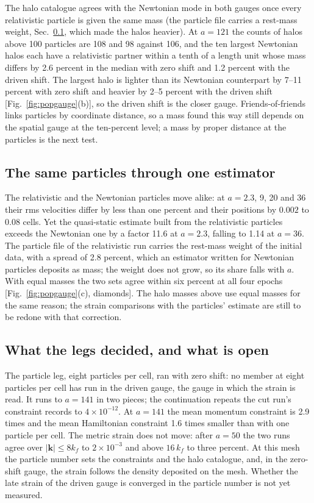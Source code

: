 \documentclass[aps,prd,twocolumn,10pt,superscriptaddress,nofootinbib,longbibliography,floatfix]{revtex4-2}
\begin{document}
The halo catalogue agrees with the Newtonian mode in both gauges once every relativistic particle is given the same mass (the particle file carries a rest-mass weight, Sec.~\ref{sec:sameparticles}, which made the halos heavier). At $a=121$ the counts of halos above 100 particles are 108 and 98 against 106, and the ten largest Newtonian halos each have a relativistic partner within a tenth of a length unit whose mass differs by 2.6 percent in the median with zero shift and 1.2 percent with the driven shift. The largest halo is lighter than its Newtonian counterpart by 7--11 percent with zero shift and heavier by 2--5 percent with the driven shift [Fig.~\ref{fig:popgauge}(b)], so the driven shift is the closer gauge. Friends-of-friends links particles by coordinate distance, so a mass found this way still depends on the spatial gauge at the ten-percent level; a mass by proper distance at the particles is the next test.

\subsection{The same particles through one estimator}\label{sec:sameparticles}

The relativistic and the Newtonian particles move alike: at $a=2.3$, 9, 20 and 36 their rms velocities differ by less than one percent and their positions by $0.002$ to $0.08$ cells. Yet the quasi-static estimate built from the relativistic particles exceeds the Newtonian one by a factor 11.6 at $a=2.3$, falling to 1.14 at $a=36$. The particle file of the relativistic run carries the rest-mass weight of the initial data, with a spread of 2.8 percent, which an estimator written for Newtonian particles deposits as mass; the weight does not grow, so its share falls with $a$. With equal masses the two sets agree within six percent at all four epochs [Fig.~\ref{fig:popgauge}(c), diamonds]. The halo masses above use equal masses for the same reason; the strain comparisons with the particles' estimate are still to be redone with that correction.

\subsection{What the legs decided, and what is open}\label{sec:popopen}

The particle leg, eight particles per cell, ran with zero shift: no member at eight particles per cell has run in the driven gauge, the gauge in which the strain is read. It runs to $a=141$ in two pieces; the continuation repeats the cut run's constraint records to $4\times10^{-12}$. At $a=141$ the mean momentum constraint is 2.9 times and the mean Hamiltonian constraint 1.6 times smaller than with one particle per cell. The metric strain does not move: after $a=50$ the two runs agree over $|\mathbf k|\le 8k_f$ to $2\times10^{-3}$ and above $16\,k_f$ to three percent. At this mesh the particle number sets the constraints and the halo catalogue, and, in the zero-shift gauge, the strain follows the density deposited on the mesh. Whether the late strain of the driven gauge is converged in the particle number is not yet measured.
\end{document}
